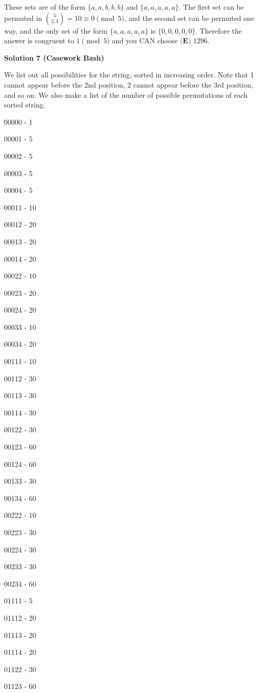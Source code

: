 \begin{enumerate}
 These sets are of the form $\{a,a,b,b,b\}$ and $\{a,a,a,a,a\}$. The first set can be permuted in $\binom{5}{2,3}=10 \equiv 0\pmod{5}$, and the second set can be permuted one way, and the only set of the form $\{a,a,a,a,a\}$ is $\{0,0,0,0,0\}$. Therefore the answer is congruent to $1\pmod{5}$ and you CAN choose $\boxed{\textbf{(E) }1296}$.

 



\textbf{Solution 7 (Casework Bash)}

We list out all possibilities for the string, sorted in increasing order. Note that 1 cannot appear before the 2nd position, 2 cannot appear before the 3rd position, and so on. We also make a list of the number of possible permutations of each sorted string.

 00000 - 1

 00001 - 5

 00002 - 5

 00003 - 5

 00004 - 5

 00011 - 10

 00012 - 20

 00013 - 20

 00014 - 20

 00022 - 10

 00023 - 20

 00024 - 20

 00033 - 10

 00034 - 20

 00111 - 10

 00112 - 30

 00113 - 30

 00114 - 30

 00122 - 30

 00123 - 60

 00124 - 60

 00133 - 30

 00134 - 60

 00222 - 10

 00223 - 30

 00224 - 30

 00233 - 30

 00234 - 60

 01111 - 5

 01112 - 20

 01113 - 20

 01114 - 20

 01122 - 30

 01123 - 60


\end{enumerate}
